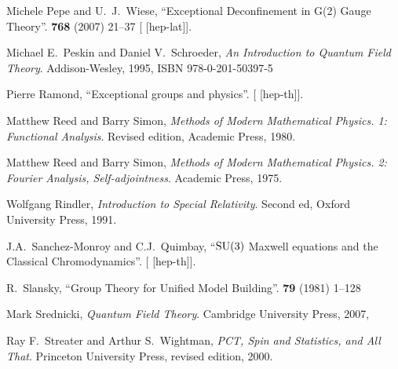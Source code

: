\begin{thebibliography}{99}
Michele Pepe and U.~J.~Wiese,
``Exceptional Deconfinement in G(2) Gauge Theory''.
 \textbf{768} (2007) 21--37
{\tt{}}
[ [hep-lat]].

Michael E.~Peskin and Daniel V.~Schroeder,
\textit{An Introduction to Quantum Field Theory}.
Addison-Wesley, 1995,
ISBN 978-0-201-50397-5

Pierre Ramond,
``Exceptional groups and physics''.
[ [hep-th]].

Matthew Reed and Barry Simon,
\textit{Methods of Modern Mathematical Physics. 1: Functional Analysis}.
Revised edition, Academic Press, 1980.

Matthew Reed and Barry Simon,
\textit{Methods of Modern Mathematical Physics. 2: Fourier Analysis, Self-adjointness}.
Academic Press, 1975.


Wolfgang Rindler,
\textit{Introduction to Special Relativity}.
Second ed, Oxford University Press, 1991.

  
J.A.~Sanchez-Monroy and C.J.~Quimbay,
``$\operatorname{SU}(3)$ Maxwell equations and the Classical Chromodynamics''.
[ [hep-th]].


R.~Slansky,
``Group Theory for Unified Model Building''.
 \textbf{79} (1981) 1--128
{\tt{}}

Mark Srednicki,
\textit{Quantum Field Theory}.
Cambridge University Press, 2007,
{\tt{}}


Ray F.~Streater and Arthur S.~Wightman,
\textit{PCT, Spin and Statistics, and All That}.
Princeton University Press, revised edition, 2000.


\end{thebibliography}
